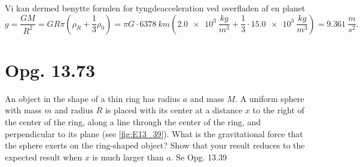 \documentclass[12pt]{article}
\theoremstyle{definition}
\begin{document}
Vi kan dermed benytte formlen for tyngdeacceleration ved overfladen af en planet
\[ 
g = \frac{GM}{R^2} = GR\pi \left( \rho_R + \frac{1}{3}\rho_0 \right) = \pi G \cdot \qty{6378}{km} \left( \qty{2,0e3}{\frac{kg}{m^3}} + \frac{1}{3} \cdot \qty{15,0e3}{\frac{kg}{m^3}}  \right) =  \qty{9,361}{\frac{m}{s^2}} 
.\]


\section*{Opg. 13.73}
An object in the shape of a thin ring has radius $a$ and mass $M$. A uniform sphere with mass $m$ and radius $R$ is placed with its center at a distance $x$ to the right of the center of the ring, along a line through the center of the ring, and perpendicular to its plane (see \autoref{fig:E13_39}). What is the gravitational force that the sphere exerts on the ring-shaped object? Show that your result reduces to the expected result when $x$ is much larger than $a$.
\bigbreak
Se Opg. 13.39
\end{document}
